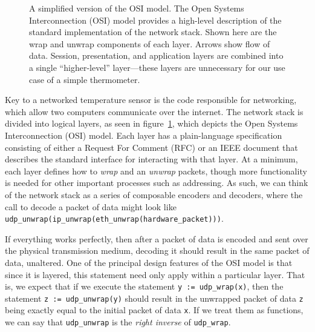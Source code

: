 \documentclass[twoside]{memoir}
\begin{document}
\begin{figure}[h]
    
    \caption{A simplified version of the OSI model.
    The Open Systems Interconnection (OSI) model provides a high-level description of the standard
implementation of the network stack.
Shown here are the wrap and unwrap components of each layer. Arrows show flow of data. Session, presentation, and application layers are combined into a single ``higher-level'' layer---these layers are unnecessary for our use case of a simple thermometer.}
    \label{fig:network-stack}
\end{figure}
Key to a networked temperature sensor is the code responsible for networking,
which allow two computers communicate over the internet.
The network stack is divided into logical layers, as seen in figure~\ref{fig:network-stack}, which depicts the Open Systems Interconnection (OSI) model.
Each layer has a plain-language specification
consisting of either a Request For Comment (RFC) or an IEEE document
that describes the standard interface for interacting with that layer.
At a minimum, each layer defines how to
\textit{wrap} and an \textit{unwrap} packets,
though more functionality is needed for other important processes such as
addressing.
As such, we can think of the network stack as a series of composable
encoders and decoders,
where the call to decode a packet of data might look like
\lstinline{udp_unwrap(ip_unwrap(eth_unwrap(hardware_packet)))}.


If everything works perfectly, then after a packet of data is encoded
and sent over the physical transmission medium, decoding it should
result in the same packet of data, unaltered.
One of the principal design features of the OSI model is that since
it is layered, this statement need only apply within a particular layer.
That is, we expect that if we execute the statement 
\lstinline{y := udp_wrap(x)}, then the statement
\lstinline{z := udp_unwrap(y)} should
result in the unwrapped packet of data \lstinline{z} being exactly equal to
the initial packet of data \lstinline{x}.
If we treat them as functions, we can say that \lstinline{udp_unwrap} is 
the \textit{right inverse} of \lstinline{udp_wrap}.
\end{document}
